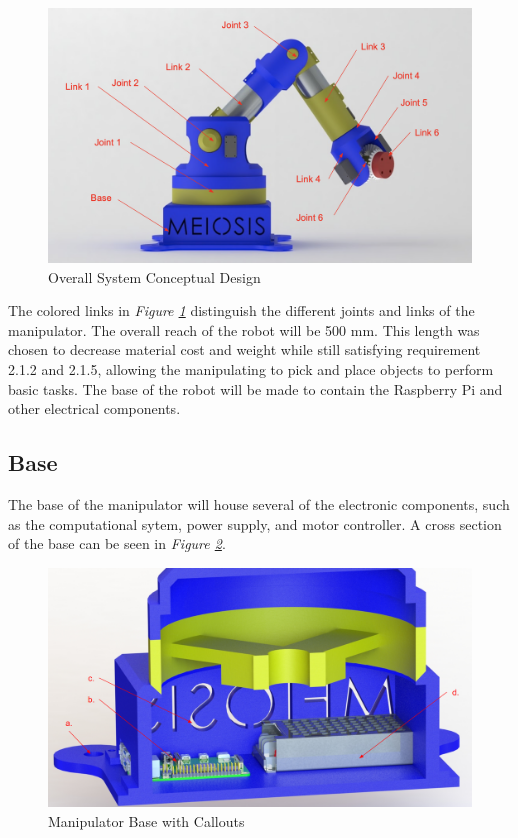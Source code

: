 \documentclass[12pt]{report}
\begin{document}
\begin{figure}[htp]
  \centering
  \includegraphics[frame, width=.75\textwidth]{overall_render}
  \caption{Overall System Conceptual Design }
  \label{fig:overall}
\end{figure}

The colored links in \emph{Figure \ref{fig:overall}} distinguish the different joints and links of the manipulator. The overall reach of the robot will be 500 mm. This length was chosen to decrease material cost and weight while still satisfying requirement 2.1.2 and 2.1.5, allowing the manipulating to pick and place objects to perform basic tasks. The base of the robot will be made to contain the Raspberry Pi and other electrical components.
\newpage
\subsection{Base}
The base of the manipulator will house several of the electronic components, such as the computational sytem, power supply, and motor controller. A cross section of the base can be seen in \emph{Figure \ref{fig:base}}.
\begin{figure}[htp]
  \centering
  \includegraphics[frame, width=.75\textwidth]{base_callouts}
  \caption{Manipulator Base with Callouts}
  \label{fig:base}
\end{figure}
\end{document}
